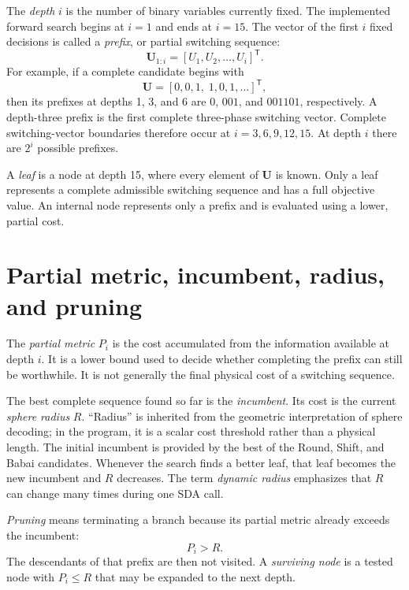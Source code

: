 \documentclass[paper=a4,oneside,fontsize=12pt,DIV=14,headings=normal,parskip=half,headsepline,numbers=noendperiod]{scrreprt}
\newcommand{\vct}[1]{\bm{#1}}
\newcommand{\T}{\mathsf{T}}
\begin{document}
The \emph{depth} $i$ is the number of binary variables currently fixed.  The
implemented forward search begins at $i=1$ and ends at $i=15$.  The vector of
the first $i$ fixed decisions is called a \emph{prefix}, or partial switching
sequence:
\begin{equation}
 \vct U_{1:i}=[U_1,U_2,\ldots,U_i]^\T.
\end{equation}
For example, if a complete candidate begins with
\begin{equation}
 \vct U=[0,0,1,\;1,0,1,\ldots]^\T,
\end{equation}
then its prefixes at depths 1, 3, and 6 are $0$, $001$, and $001101$,
respectively.  A depth-three prefix is the first complete three-phase switching
vector.  Complete switching-vector boundaries therefore occur at
$i=3,6,9,12,15$.  At depth $i$ there are $2^i$ possible prefixes.

A \emph{leaf} is a node at depth 15, where every element of $\vct U$ is known.
Only a leaf represents a complete admissible switching sequence and has a full
objective value.  An internal node represents only a prefix and is evaluated
using a lower, partial cost.

\section{Partial metric, incumbent, radius, and pruning}
The \emph{partial metric} $P_i$ is the cost accumulated from the information
available at depth $i$.  It is a lower bound used to decide whether completing
the prefix can still be worthwhile.  It is not generally the final physical
cost of a switching sequence.

The best complete sequence found so far is the \emph{incumbent}.  Its cost is
the current \emph{sphere radius} $R$.  ``Radius'' is inherited from the
geometric interpretation of sphere decoding; in the program, it is a scalar
cost threshold rather than a physical length.  The initial incumbent is
provided by the best of the Round, Shift, and Babai candidates.  Whenever the
search finds a better leaf, that leaf becomes the new incumbent and $R$
decreases.  The term \emph{dynamic radius} emphasizes that $R$ can change many
times during one SDA call.

\emph{Pruning} means terminating a branch because its partial metric already
exceeds the incumbent:
\begin{equation}
 P_i>R.
\end{equation}
The descendants of that prefix are then not visited.  A \emph{surviving node}
is a tested node with $P_i\leq R$ that may be expanded to the next depth.
\end{document}

